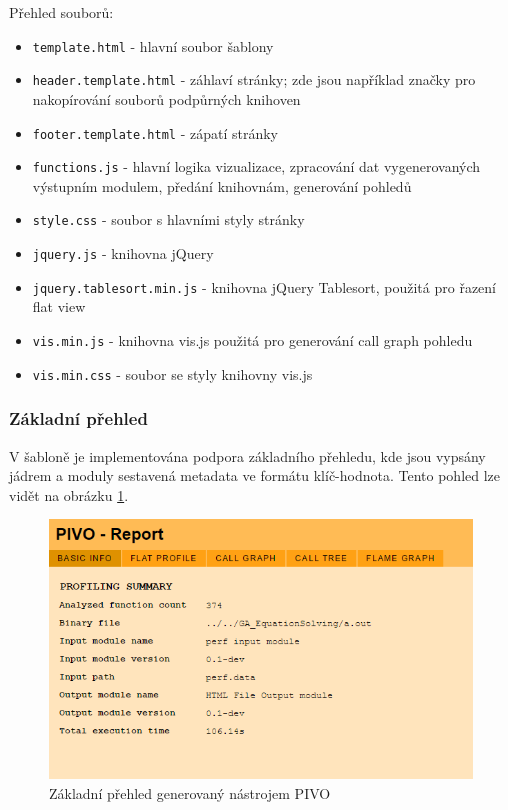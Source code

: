\documentclass[czech,BP]{thesiskiv}
\begin{document}
\newpage
Přehled souborů:
\begin{itemize}
\item \texttt{template.html} - hlavní soubor šablony
\item \texttt{header.template.html} - záhlaví stránky; zde jsou například značky pro nakopírování souborů podpůrných knihoven
\item \texttt{footer.template.html} - zápatí stránky
\item \texttt{functions.js} - hlavní logika vizualizace, zpracování dat vygenerovaných výstupním modulem, předání knihovnám, generování pohledů
\item \texttt{style.css} - soubor s hlavními styly stránky
\item \texttt{jquery.js} - knihovna jQuery
\item \texttt{jquery.tablesort.min.js} - knihovna jQuery Tablesort, použitá pro řazení flat view
\item \texttt{vis.min.js} - knihovna vis.js použitá pro generování call graph pohledu
\item \texttt{vis.min.css} - soubor se styly knihovny vis.js
\end{itemize}

\subsubsection*{Základní přehled}

V šabloně je implementována podpora základního přehledu, kde jsou vypsány jádrem a moduly sestavená metadata ve formátu klíč-hodnota. Tento pohled lze vidět na obrázku \ref{obr:implbasic}.

\begin{figure}[h]
    \centering
    \includegraphics[interpolate,width=1.0\textwidth]{img/pivo_basic.png}
    \caption{Základní přehled generovaný nástrojem PIVO}
    \label{obr:implbasic}
\end{figure}
\end{document}
